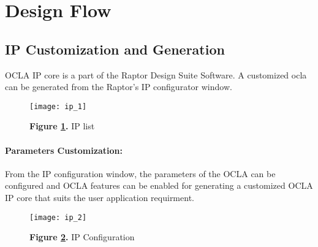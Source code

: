 


\newpage
{}
\section*{ \hfill Design Flow}


\subsection*{\fontsize{14}{16}\selectfont IP Customization and Generation}
OCLA IP core is a part of the Raptor Design Suite Software. A customized ocla can be generated from the Raptor's IP configurator window.
\begin{figure}[h]\centering %
	\texttt{[image: ip\_1]}
	\caption{\textbf{Figure \ref{fig:ip_1}.} IP list}
	\label{fig:ip_1}
\end{figure}
\newpage
\paragraph{Parameters Customization:}
From the IP configuration window, the parameters of the OCLA can be configured and OCLA features can be enabled for generating a customized OCLA IP core that suits the user application requirment.
\begin{figure}[h]\centering %
	\texttt{[image: ip\_2]}
	\caption{\textbf{Figure \ref{fig:ip_2}.} IP Configuration }
	\label{fig:ip_2}
\end{figure}



